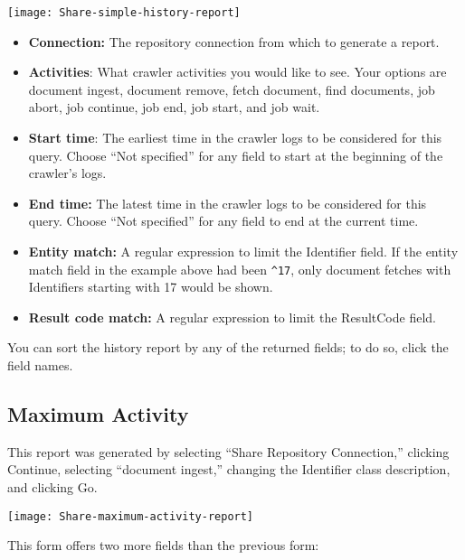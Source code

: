 \begin{changemargin}{1.5in}{0in}
\texttt{[image: Share-simple-history-report]}

\begin{itemize}

\item \textbf{Connection:} The repository connection from which to generate
a report.

\item \textbf{Activities}: What crawler activities you would like to see. 
Your options are document ingest, document remove, fetch document, find 
documents, job abort, job continue, job end, job start, and job wait. 

\item \textbf{Start time}: The earliest time in the crawler logs to be
considered for this query.  Choose ``Not specified'' for any field to
start at the beginning of the crawler's logs.

\item \textbf{End time:} The latest time in the crawler logs to be
considered for this query. Choose ``Not specified'' for any field 
to end at the current time.

\item \textbf{Entity match:} A regular expression to limit the
Identifier field. If the entity match field in the example above had
been \texttt{\^{}17}, only document fetches with Identifiers starting
with 17 would be shown.

\item \textbf{Result code match:} A regular expression to limit the
ResultCode field.

\end{itemize}

You can sort the history report by any of the returned fields; to do so,
click the field names.

\subsection{Maximum Activity}

This report was generated by selecting ``Share Repository Connection,''
clicking Continue, selecting ``document ingest,'' changing the Identifier
class description, and clicking Go.

\texttt{[image: Share-maximum-activity-report]}

This form offers two more fields than the previous form:

\begin{itemize}


\end{itemize}
\end{changemargin}
